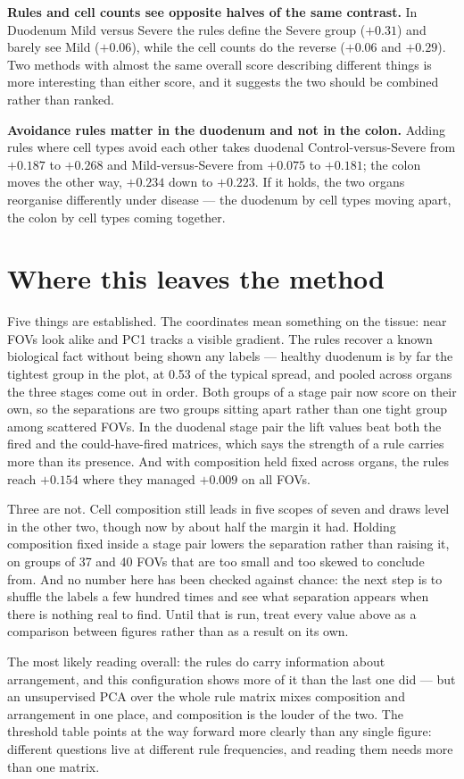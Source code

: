\documentclass[10pt,a4paper]{article}
\begin{document}
\textbf{Rules and cell counts see opposite halves of the same contrast.} In Duodenum Mild
versus Severe the rules define the Severe group ($+0.31$) and barely see Mild ($+0.06$),
while the cell counts do the reverse ($+0.06$ and $+0.29$). Two methods with almost the same
overall score describing different things is more interesting than either score, and it
suggests the two should be combined rather than ranked.

\textbf{Avoidance rules matter in the duodenum and not in the colon.} Adding rules where
cell types avoid each other takes duodenal Control-versus-Severe from $+0.187$ to $+0.268$
and Mild-versus-Severe from $+0.075$ to $+0.181$; the colon moves the other way, $+0.234$
down to $+0.223$. If it holds, the two organs reorganise differently under disease --- the
duodenum by cell types moving apart, the colon by cell types coming together.

\section*{Where this leaves the method}

Five things are established. The coordinates mean something on the tissue: near FOVs look
alike and PC1 tracks a visible gradient. The rules recover a known biological fact without
being shown any labels --- healthy duodenum is by far the tightest group in the plot, at
0.53 of the typical spread, and pooled across organs the three stages come out in order.
Both groups of a stage pair now score on their own, so the separations are two groups
sitting apart rather than one tight group among scattered FOVs. In the duodenal stage pair
the lift values beat both the fired and the could-have-fired matrices, which says the
strength of a rule carries more than its presence. And with composition held fixed across
organs, the rules reach $+0.154$ where they managed $+0.009$ on all FOVs.

Three are not. Cell composition still leads in five scopes of seven and draws level in the
other two, though now by about half the margin it had. Holding composition fixed inside a stage pair lowers the separation rather
than raising it, on groups of 37 and 40 FOVs that are too small and too skewed to conclude
from. And no number here has been checked against chance: the next step is to shuffle the
labels a few hundred times and see what separation appears when there is nothing real to
find. Until that is run, treat every value above as a comparison between figures rather
than as a result on its own.

The most likely reading overall: the rules do carry information about arrangement, and this
configuration shows more of it than the last one did --- but an unsupervised PCA over the
whole rule matrix mixes composition and arrangement in one place, and composition is the
louder of the two. The threshold table points at the way forward more clearly than any
single figure: different questions live at different rule frequencies, and reading them
needs more than one matrix.
\end{document}
